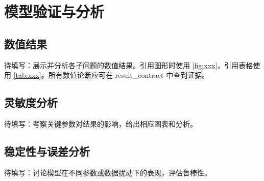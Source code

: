 \section{模型验证与分析}\label{sec:validation}

\subsection{数值结果}\label{sec:results}
待填写：展示并分析各子问题的数值结果。引用图形时使用 \ref{fig:xxx}，引用表格使用 \ref{tab:xxx}。所有数值论断应可在 result_contract 中查到证据。

\subsection{灵敏度分析}\label{sec:sensitivity}
待填写：考察关键参数对结果的影响，给出相应图表和分析。

\subsection{稳定性与误差分析}\label{sec:stability}
待填写：讨论模型在不同参数或数据扰动下的表现，评估鲁棒性。

